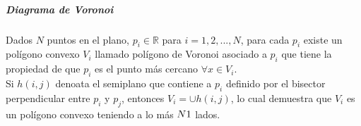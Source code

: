 \subparagraph{Diagrama de Voronoi}
Dados $N$ puntos en el plano, $p_i \in \mathbb{R} $ para $i=1,2,...,N$, para cada $p_i$ existe un polígono convexo $V_i$ llamado polígono de Voronoi asociado a $p_i$ que tiene la propiedad de que $p_i$ es el punto más cercano $\forall x \in V_i$. \\
Si $h(i,j)$ denoata el semiplano que contiene a $p_i$ definido por el bisector perpendicular entre $p_i$ y $p_j$, entonces $V_i = \cup h(i,j)$, lo cual demuestra que $V_i$ es un polígono convexo teniendo a lo más $N\-1$ lados.





















